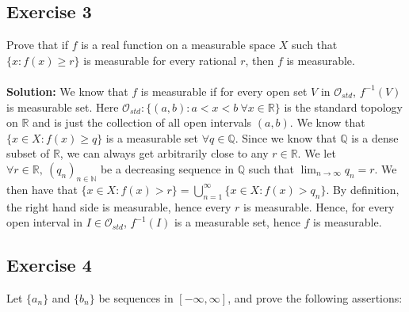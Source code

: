 \documentclass{article}
\begin{document}
\subsection*{Exercise 3}
Prove that if $f$ is a real function on a measurable space $X$ such that $\{ x:f(x) \ge r\}$ is measurable
for every rational $r$, then $f$ is measurable.
\\\\
\textbf{Solution:}
We know that $f$ is measurable if for every open set $V$ in $\mathcal{O}_{std}$, $f^{-1}(V)$ is measurable set.
Here $\mathcal{O}_{std}:\{ (a,b): a < x < b \ \forall x \in \mathbb{R} \}$ is the standard topology on $\mathbb{R}$ and is just the collection of all open intervals $(a,b)$.
We know that $\{x \in X: f(x) \ge q\}$ is a measurable set $ \forall q \in \mathbb{Q}$. Since we know that $\mathbb{Q}$ is a dense subset of $\mathbb{R}$, we can always get arbitrarily close to any $r \in \mathbb{R}$.
We let $\forall r \in \mathbb{R}, \ (q_n)_{n\in\mathbb{N}}$ be a decreasing sequence in $\mathbb{Q}$ such that $\lim_{n\to\infty} q_n = r$.
We then have that $\{x \in X: f(x) > r\} = \bigcup_{n=1}^{\infty} \{ x \in X: f(x) > q_n\}$.
By definition, the right hand side is measurable, hence every $r$ is measurable.
Hence, for every open interval in $ I \in \mathcal{O}_{std}$, $f^{-1}(I)$ is a measurable set, hence $f$ is measurable.


\subsection*{Exercise 4}
Let $\{a_n\}$ and $\{b_n\}$ be sequences in $[-\infty, \infty]$, and prove the following assertions:
\end{document}
